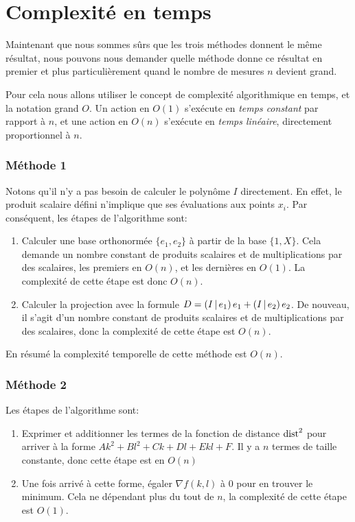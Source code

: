 \section{Complexité en temps}

Maintenant que nous sommes sûrs que les trois méthodes donnent le même
résultat, nous pouvons nous demander quelle méthode donne ce résultat
en premier et plus particulièrement quand le nombre de mesures $n$ devient
grand.

Pour cela nous allons utiliser le concept de complexité algorithmique
en temps, et la notation grand $O$.
Un action en $O(1)$ s'exécute en \emph{temps constant} par rapport à $n$,
et une action en $O(n)$ s'exécute en \emph{temps linéaire},
directement proportionnel à $n$.

\subsubsection*{Méthode 1}

Notons qu'il n'y a pas besoin de calculer le polynôme $I$ directement.
En effet, le produit scalaire défini n'implique que ses évaluations
aux points $x_i$.
Par conséquent, les étapes de l'algorithme sont:
\begin{enumerate}
    \item Calculer une base orthonormée $\{e_1,e_2\}$ à partir de la base
        $\{1,X\}$. Cela demande un nombre constant de produits scalaires
        et de multiplications par des scalaires,
        les premiers en $O(n)$, et les dernières en $O(1)$.
        La complexité de cette étape est donc $O(n)$.
    \item Calculer la projection avec la formule
        $D=\left(I\,\middle|\,e_1\right)e_1+\left(I\,\middle|\,e_2\right)e_2$.
        De nouveau, il s'agit d'un nombre constant de produits scalaires
        et de multiplications par des scalaires,
        donc la complexité de cette étape est $O(n)$.
\end{enumerate}

En résumé la complexité temporelle de cette méthode est $O(n)$.

\subsubsection*{Méthode 2}

Les étapes de l'algorithme sont:
\begin{enumerate}
    \item Exprimer et additionner les termes de la fonction de distance
        $\mathrm{dist}^2$ pour arriver à la forme $Ak^2+Bl^2+Ck+Dl+Ekl+F$.
        Il y a $n$ termes de taille constante, donc cette étape
        est en $O(n)$
    \item Une fois arrivé à cette forme, égaler $\nabla f(k,l)$ à 0
        pour en trouver le minimum.
        Cela ne dépendant plus du tout de $n$, la complexité de cette étape
        est $O(1)$.
\end{enumerate}

